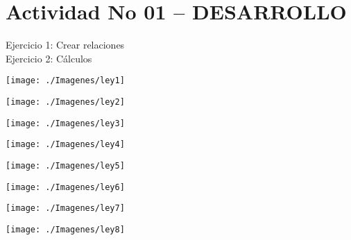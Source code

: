 \section{Actividad No 01 – DESARROLLO} 

Ejercicio 1: Crear relaciones \\
Ejercicio 2: Cálculos \\

	\begin{center}
	\texttt{[image: ./Imagenes/ley1]}
	\end{center}	

	\begin{center}
	\texttt{[image: ./Imagenes/ley2]}
	\end{center}	

	\begin{center}
	\texttt{[image: ./Imagenes/ley3]}
	\end{center}	

	\begin{center}
	\texttt{[image: ./Imagenes/ley4]}
	\end{center}	

	\begin{center}
	\texttt{[image: ./Imagenes/ley5]}
	\end{center}	

	\begin{center}
	\texttt{[image: ./Imagenes/ley6]}
	\end{center}	

	\begin{center}
	\texttt{[image: ./Imagenes/ley7]}
	\end{center}	

	\begin{center}
	\texttt{[image: ./Imagenes/ley8]}
	\end{center}	
